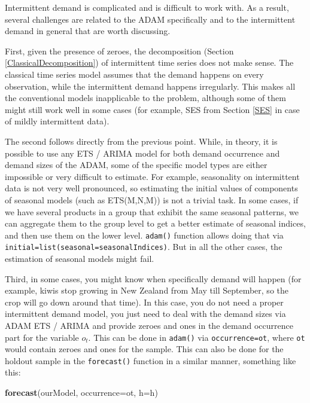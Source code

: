 \documentclass[]{book}
\newenvironment{Shaded}{\begin{snugshade}}{\end{snugshade}}
\newcommand{\DataTypeTok}[1]{\textcolor[rgb]{0.13,0.29,0.53}{#1}}
\newcommand{\KeywordTok}[1]{\textcolor[rgb]{0.13,0.29,0.53}{\textbf{#1}}}
\newcommand{\NormalTok}[1]{#1}
\theoremstyle{definition}
\theoremstyle{definition}
\theoremstyle{definition}
\theoremstyle{definition}
\theoremstyle{remark}
\begin{document}
Intermittent demand is complicated and is difficult to work with. As a result, several challenges are related to the ADAM specifically and to the intermittent demand in general that are worth discussing.

First, given the presence of zeroes, the decomposition (Section \ref{ClassicalDecomposition}) of intermittent time series does not make sense. The classical time series model assumes that the demand happens on every observation, while the intermittent demand happens irregularly. This makes all the conventional models inapplicable to the problem, although some of them might still work well in some cases (for example, SES from Section \ref{SES} in case of mildly intermittent data).

The second follows directly from the previous point. While, in theory, it is possible to use any ETS / ARIMA model for both demand occurrence and demand sizes of the ADAM, some of the specific model types are either impossible or very difficult to estimate. For example, seasonality on intermittent data is not very well pronounced, so estimating the initial values of components of seasonal models (such as ETS(M,N,M)) is not a trivial task. In some cases, if we have several products in a group that exhibit the same seasonal patterns, we can aggregate them to the group level to get a better estimate of seasonal indices, and then use them on the lower level. \texttt{adam()} function allows doing that via \texttt{initial=list(seasonal=seasonalIndices)}. But in all the other cases, the estimation of seasonal models might fail.

Third, in some cases, you might know when specifically demand will happen (for example, kiwis stop growing in New Zealand from May till September, so the crop will go down around that time). In this case, you do not need a proper intermittent demand model, you just need to deal with the demand sizes via ADAM ETS / ARIMA and provide zeroes and ones in the demand occurrence part for the variable \(o_t\). This can be done in \texttt{adam()} via \texttt{occurrence=ot}, where \texttt{ot} would contain zeroes and ones for the sample. This can also be done for the holdout sample in the \texttt{forecast()} function in a similar manner, something like this:

\begin{Shaded}
\begin{Highlighting}[]
\KeywordTok{forecast}\NormalTok{(ourModel, }\DataTypeTok{occurrence=}\NormalTok{ot, }\DataTypeTok{h=}\NormalTok{h)}
\end{Highlighting}
\end{Shaded}
\end{document}
